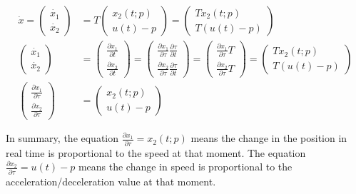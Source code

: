 	\begin{subequations}
		\begin{align}
			\dot{x} =  \begin{pmatrix} \dot{x_1} \\ \dot{x_2} \end{pmatrix}  & =  T  \begin{pmatrix}  x_2(t;p) \\ u(t)-p   \end{pmatrix} = \begin{pmatrix}  Tx_2(t;p) \\ T(u(t)-p)   \end{pmatrix} \label{eq_difT} \\ 
			\begin{pmatrix} \dot{x_1} \\ \dot{x_2} \end{pmatrix} &= \begin{pmatrix} \frac{\partial x_1}{\partial t} \\ \frac{\partial x_2}{\partial t} \end{pmatrix} = \begin{pmatrix} \frac{\partial x_1}{\partial \tau} \frac{\partial \tau}{\partial t} \\ \frac{\partial x_2}{\partial \tau} \frac{\partial \tau}{\partial t} \end{pmatrix} =  \begin{pmatrix} \frac{\partial x_1}{\partial \tau} T \\ \frac{\partial x_2}{\partial \tau}T \end{pmatrix} =     \begin{pmatrix}  Tx_2(t;p) \\ T(u(t)-p)   \end{pmatrix} \\
			\begin{pmatrix} \frac{\partial x_1}{\partial \tau}  \\ \frac{\partial x_2}{\partial \tau} \end{pmatrix} & =     \begin{pmatrix}  x_2(t;p) \\ u(t)-p   \end{pmatrix} \label{eq_difTau}
		\end{align}
		\label{partialX}
	\end{subequations}
	
	In summary, the equation $\frac{\partial x_1}{\partial \tau}= x_2(t;p) $ means the change in the position in real time is proportional to the speed at that moment. The equation $\frac{\partial x_2}{\partial \tau} = u(t)-p $ means the change in speed is proportional to the acceleration/deceleration value at that moment. 
	
